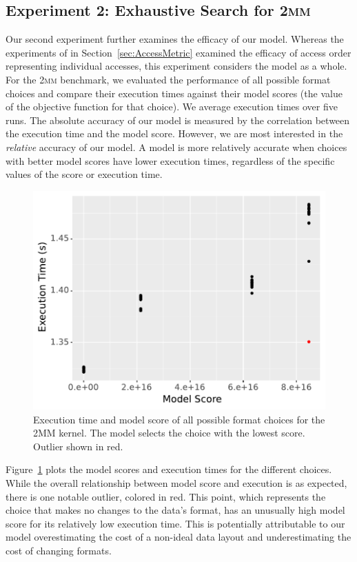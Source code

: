 \documentclass[sigconf]{acmart}
\begin{document}
\subsection{Experiment 2: Exhaustive Search for \textsc{2mm}}

Our second experiment further examines the efficacy of our model. 
Whereas the experiments of in Section~\ref{sec:AccessMetric} examined the efficacy of access order representing individual accesses, this experiment considers the model as a whole.
For the \textsc{2mm} benchmark, we evaluated the performance of all possible format choices and compare their execution times against their model scores (the value of the objective function for that choice).
We average execution times over five runs.
The absolute accuracy of our model is measured by the correlation between the execution time and the model score.
However, we are most interested in the \textit{relative} accuracy of our model.
A model is more relatively accurate when choices with better model scores have lower execution times, regardless of the specific values of the score or execution time.

\begin{figure}
	\includegraphics[width=\columnwidth]{2mm-all.pdf}
	\caption{Execution time and model score of all possible format choices for the 2MM kernel. The model selects the choice with the lowest score. Outlier shown in red.}
	\label{2MMAllChoices}
\end{figure}


Figure~\ref{2MMAllChoices} plots the model scores and execution times for the different choices. 
While the overall relationship between model score and execution is as expected, there is one notable outlier, colored in red.
This point, which represents the choice that makes no changes to the data's format, has an unusually high model score for its relatively low execution time. 
This is potentially attributable to our model overestimating the cost of a non-ideal data layout and underestimating the cost of changing formats. 
\end{document}
